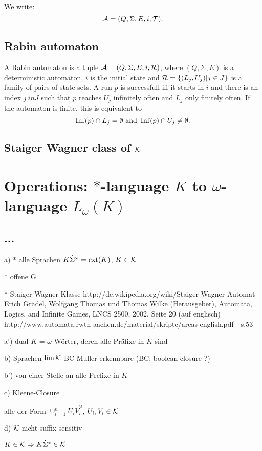 We write:
\[ \mathcal{A} = (Q, \Sigma, E, i, \mathcal{T}) . \]

\subsection{Rabin automaton}
A Rabin automaton is a tuple $\mathcal{A} = (Q, \Sigma, E, i, \mathcal{R})$, where $(Q,\Sigma,E)$ is a deterministic automaton, $i$ is the initial state and $\mathcal{R} = \{(L_j, U_j) | j \in J\}$ is a family of pairs of state-sets. A run $p$ is successfull iff it starts in $i$ and there is an index $j \ in J$ such that $p$ reaches $U_j$ infinitely often and $L_j$ only finitely often. If the automaton is finite, this is equivalent to
\[ \Inf(p) \cap L_j = \emptyset \ \text{and} \ \Inf(p) \cap U_j \neq \emptyset . \]

\subsection{Staiger Wagner class of $\mathcal{K}$}

\section{Operations: $*$-language $K$ to $\omega$-language $L_\omega (K)$}
\subsection{...}
a)
* alle Sprachen $K \dot \Sigma^\omega = \operatorname{ext}(K)$, $K \in \mathcal{K}$

* offene G

* Staiger Wagner Klasse
http://de.wikipedia.org/wiki/Staiger-Wagner-Automat
Erich Grädel, Wolfgang Thomas und Thomas Wilke (Herausgeber), Automata, Logics, and Infinite Games, LNCS 2500, 2002, Seite 20 (auf englisch)
http://www.automata.rwth-aachen.de/material/skripte/areas-english.pdf - s.53

a')
dual $\overline{K}$ = $\omega$-Wörter, deren alle Präfixe in $K$ sind

b) Sprachen $\lim \mathcal{K}$
BC Muller-erkennbare
(BC: boolean closure ?)

b') von einer Stelle an alle Prefixe in $K$

c) Kleene-Closure

alle der Form $\cup_{i=1}^n U_i \dot V_i^\omega$, $U_i, V_i \in \mathcal{K}$

d) $\mathcal{K}$ nicht suffix sensitiv

$K \in \mathcal{K} \Rightarrow K \dot \Sigma^* \in \mathcal{K}$  
